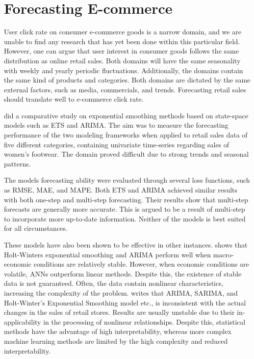 \section{Forecasting E-commerce}
\label{section:RelatedWork:forecasting-ecommerce}

User click rate on consumer e-commerce goods is a narrow domain,
and we are unable to find any research that has yet been done within this particular field.
However, one can argue that user interest in consumer goods follows the same distribution
as online retail sales.
Both domains will have the same seasonality with weekly and yearly periodic fluctuations.
Additionally, the domains contain the same kind of products and categories.
Both domains are dictated by the same external factors, such as media, commercials,
and trends.
Forecasting retail sales should translate well to e-commerce click rate.


\cite{Ramos2015} did a comparative study on exponential smoothing methods
based on state-space models such as ETS and ARIMA.
The aim was to measure the forecasting performance of the two modeling frameworks
when applied to retail sales data of five different categories,
containing univariate time-series regarding sales of women's footwear.
The domain proved difficult due to strong trends and seasonal patterns.

The models forecasting ability were evaluated through several loss functions, such as RMSE, MAE, and MAPE.
Both ETS and ARIMA achieved similar results with both one-step and multi-step forecasting.
Their results show that multi-step forecasts are generally more accurate.
This is argued to be a result of multi-step to incorporate more up-to-date information.
Neither of the models is best suited for all circumstances.



These models have also been shown to be effective in other instances.
\cite{Chu2003} shows that Holt-Winters exponential smoothing and ARIMA perform well when macro-economic
conditions are relatively stable.
However, when economic conditions are volatile, ANNs outperform linear methods.
Despite this, the existence of stable data is not guaranteed.
Often, the data contain nonlinear characteristics, increasing the complexity of the problem.
\cite{Weng2020} writes that ARIMA, SARIMA, and Holt-Winter's
Exponential Smoothing model etc., is inconsistent with the actual changes in the sales
of retail stores.
Results are usually unstable due to their in-applicability
in the processing of nonlinear relationships.
Despite this, statistical methods have the advantage of high interpretability,
whereas more complex machine learning methods are limited by the high complexity and reduced interpretability.



